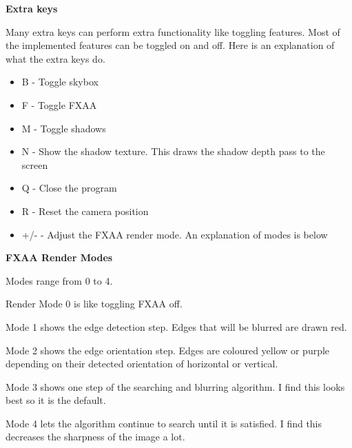 \documentclass[10pt]{article}
\begin{document}
	\begin{center}
		\bf Extra keys
	\end{center}
	Many extra keys can perform extra functionality like toggling features. Most of the implemented features can be toggled on and off. Here is an explanation of what the extra keys do.
	
	\begin{itemize}
		\item B - Toggle skybox
		\item F - Toggle FXAA
		\item M - Toggle shadows
		\item N - Show the shadow texture. This draws the shadow depth pass to the screen
		\item Q - Close the program
		\item R - Reset the camera position
		\item +/- - Adjust the FXAA render mode. An explanation of modes is below
	\end{itemize}
	
	\begin{center}
		\bf FXAA Render Modes
	\end{center}
	
	Modes range from 0 to 4.
	
	Render Mode 0 is like toggling FXAA off.
	
	Mode 1 shows the edge detection step. Edges that will be blurred are drawn red.
	
	Mode 2 shows the edge orientation step. Edges are coloured yellow or purple depending on their detected orientation of horizontal or vertical.
	
	Mode 3 shows one step of the searching and blurring algorithm. I find this looks best so it is the default.
	
	Mode 4 lets the algorithm continue to search until it is satisfied. I find this decreases the sharpness of the image a lot.
\end{document}
